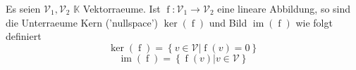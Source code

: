 Es seien $\mathcal{V}_1, \mathcal{V}_2$ $\mathbb{K}$ Vektorraeume. Ist $\operatorname{f} : \mathcal{V}_1 \to \mathcal{V}_2$ eine lineare Abbildung, so sind die Unterraeume Kern ('nullspace') $\operatorname{ker}(\operatorname{f})$ und Bild $\operatorname{im}(\operatorname{f})$ wie folgt definiert
$$\operatorname{ker}(\operatorname{f}) = \left\{ v \in \mathcal{V} | \operatorname{f}(v) = 0 \right\}$$ 
$$\operatorname{im}(\operatorname{f}) = \left\{ \operatorname{f}(v) | v \in \mathcal{V} \right\}$$
